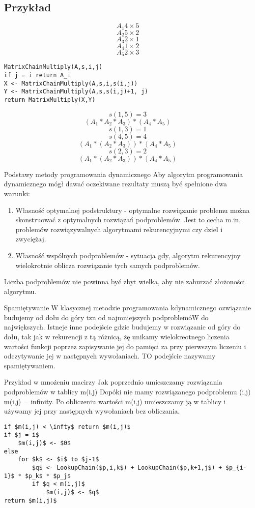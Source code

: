 \subsection{Przykład}
$$ A_1 4 \times 5 $$
$$ A_2 5 \times 2 $$
$$ A_3 2 \times 1 $$
$$ A_4 1 \times 2 $$
$$ A_5 2 \times 3 $$

\begin{lstlisting}
MatrixChainMultiply(A,s,i,j)
if j = i return A_i
X <- MatrixChainMultiply(A,s,i,s(i,j))
Y <- MatrixChainMultiply(A,s,s(i,j)+1, j)
return MatrixMultiply(X,Y)
\end{lstlisting}

$$s(1,5) = 3$$
$$(A_1 * A_2 * A_3) * (A_4 * A_5)$$
$$s(1,3) = 1$$
$$s(4,5) = 4$$
$$(A_1 * (A_2 * A_3)) * (A_4 * A_5)$$
$$s(2,3) = 2$$
$$(A_1 * (A_2 * A_3)) * (A_4 * A_5)$$

Podstawy metody programowania dynamicznego
Aby algorytm programowania dynamicznego mógł dawać oczekiwane rezultaty muszą być spełnione dwa warunki:

\begin{enumerate}
\item Własność optymalnej podstruktury - optymalne rozwiązanie problemu można skonstruować z optymalnych rozwiązań podproblemów. Jest to cecha m.in. problemów rozwiązywalnych algorytmami rekurencyjnymi czy dziel i zwyciężaj.
\item Własność wspólnych podproblemów - sytuacja gdy, algorytm rekurencyjny wielokrotnie oblicza rozwiązanie tych samych podproblemów.
\end{enumerate}
Liczba podproblemów nie powinna być zbyt wielka, aby nie zaburzać złożoności algorytmu.

Spamiętywanie
W klasycznej metodzie programowania kdynamicznego ozwiązanie budujemy od dołu do góry tzn od najmniejszych podproblemóW do największych. Istneje inne podejście gdzie budujemy w rozwiązanie od góry do dołu, tak jak w rekurencji z tą różnicą, żę unikamy wielokreotnego liczenia wartości funkcji poprzez zapisywanie jej do pamięci za przy pierwszym liczeniu  i odczytywanie jej w następnych wywołaniach. TO podejście nazywamy spamiętywaniem.

Przykład w mnożeniu macirzy
Jak poprzednio umieszczamy rozwiązania podproblemów w tablicy m(i.j) Dopóki nie mamy rozwiązanego podproblemu (i,j)  m(i,j) = infinity. Po obliczeniu wartości m(i,j) umieszczamy ją w tablicy i używamy jej przy następnych wywołaniach bez obliczania.

\begin{lstlisting}[caption={Algorytm LookupChain(p,i,j) //p - ciąg wymiarów macierzy}]
if $m(i,j) < \infty$ return $m(i,j)$
if $j = i$ 
	$m(i,j)$ <- $0$
else
	for $k$ <- $i$ to $j-1$
		$q$ <- LookupChain($p,i,k$) + LookupChain($p,k+1,j$) + $p_{i-1}$ * $p_k$ * $p_j$
		if $q < m(i,j)$
			$m(i,j)$ <- $q$
return $m(i,j)$
\end{lstlisting}

